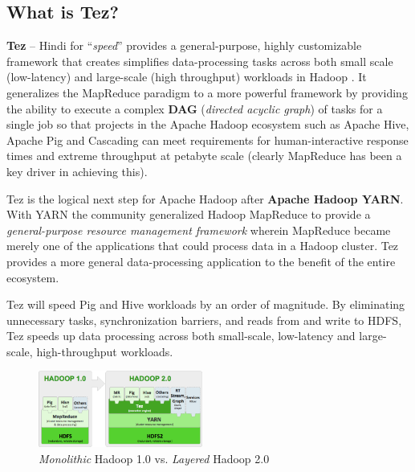 \documentclass[twocolumn]{article}
\begin{document}
\subsection{What is Tez?}

\textbf{Tez} -- Hindi for ``\emph{speed}'' provides a general-purpose, highly customizable
framework that creates simplifies data-processing tasks across both
small scale (low-latency) and large-scale (high throughput) workloads in
Hadoop \cite{Saha:2013-01}. It generalizes the MapReduce paradigm to a more powerful
framework by providing the ability to execute a complex \textbf{DAG}
(\emph{directed acyclic graph}) of tasks for a single job so that
projects in the Apache Hadoop ecosystem such as Apache Hive, Apache Pig
and Cascading can meet requirements for human-interactive response times
and extreme throughput at petabyte scale (clearly MapReduce has been a
key driver in achieving this).

Tez is the logical next step for Apache Hadoop after \textbf{Apache
Hadoop YARN}. With YARN the community generalized Hadoop MapReduce to
provide a \emph{general-purpose resource management framework} wherein
MapReduce became merely one of the applications that could process data
in a Hadoop cluster. Tez provides a more general data-processing
application to the benefit of the entire ecosystem.

Tez will speed Pig and Hive workloads by an order of magnitude. By
eliminating unnecessary tasks, synchronization barriers, and reads from
and write to HDFS, Tez speeds up data processing across both
small-scale, low-latency and large-scale, high-throughput workloads.

\begin{figure}[htb]
        \centering
        \includegraphics[width=0.48\textwidth]{hadoopstack}
        \caption{\textit{Monolithic} Hadoop 1.0 vs. \textit{Layered} Hadoop 2.0}
        \label{fig01}
\end{figure}
\end{document}
